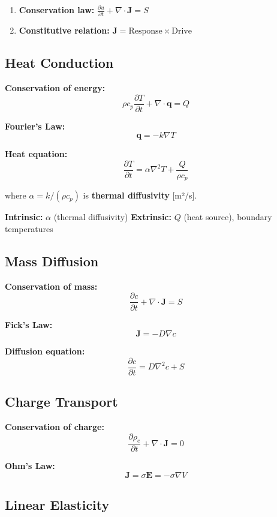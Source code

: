 \documentclass[
]{article}
\providecommand{\tightlist}{%
  \setlength{\itemsep}{0pt}\setlength{\parskip}{0pt}}
\begin{document}
\begin{enumerate}
\def\labelenumi{\arabic{enumi}.}
\tightlist
\item
  \textbf{Conservation law:}
  \(\frac{\partial u}{\partial t} + \nabla \cdot \mathbf{J} = S\)
\item
  \textbf{Constitutive relation:}
  \(\mathbf{J} = \text{Response} \times \text{Drive}\)
\end{enumerate}

\subsection{Heat Conduction}\label{heat-conduction}

\textbf{Conservation of energy:}
\[\rho c_p \frac{\partial T}{\partial t} + \nabla \cdot \mathbf{q} = Q\]

\textbf{Fourier's Law:} \[\mathbf{q} = -k\nabla T\]

\textbf{Heat equation:}
\[\frac{\partial T}{\partial t} = \alpha \nabla^2 T + \frac{Q}{\rho c_p}\]

where \(\alpha = k/(\rho c_p)\) is \textbf{thermal diffusivity}
{[}m²/s{]}.

\textbf{Intrinsic:} \(\alpha\) (thermal diffusivity) \textbf{Extrinsic:}
\(Q\) (heat source), boundary temperatures

\subsection{Mass Diffusion}\label{mass-diffusion}

\textbf{Conservation of mass:}
\[\frac{\partial c}{\partial t} + \nabla \cdot \mathbf{J} = S\]

\textbf{Fick's Law:} \[\mathbf{J} = -D\nabla c\]

\textbf{Diffusion equation:}
\[\frac{\partial c}{\partial t} = D\nabla^2 c + S\]

\subsection{Charge Transport}\label{charge-transport}

\textbf{Conservation of charge:}
\[\frac{\partial \rho_e}{\partial t} + \nabla \cdot \mathbf{J} = 0\]

\textbf{Ohm's Law:}
\[\mathbf{J} = \sigma \mathbf{E} = -\sigma \nabla V\]

\subsection{Linear Elasticity}\label{linear-elasticity}
\end{document}
